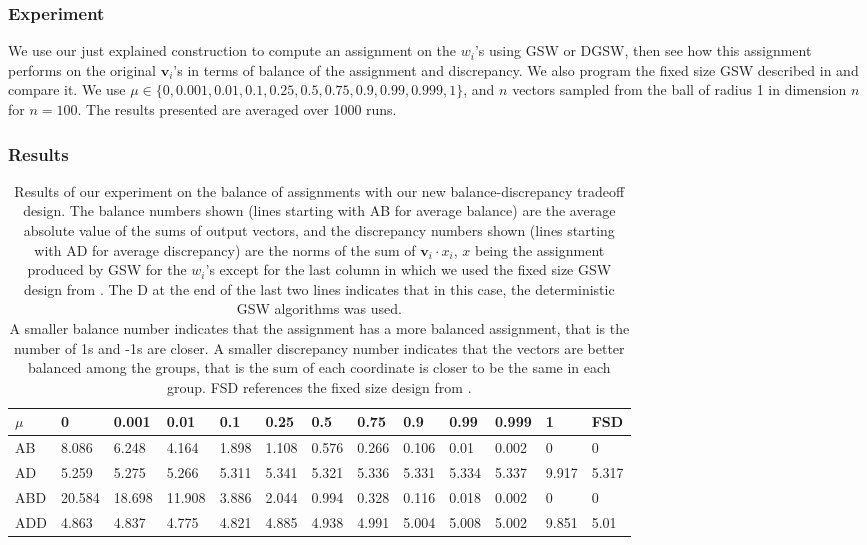 \documentclass[12pt]{article}
\begin{document}
\subsubsection{Experiment}
We use our just explained construction to compute an assignment on the $w_i$'s using GSW or DGSW, then see how this assignment performs on the original $\textbf{v}_i$'s in terms of balance of the assignment and discrepancy. We also program the fixed size GSW described in \cite{harshaw2019balancing} and compare it. We use $\mu\in\{0,0.001,0.01,0.1,0.25,0.5,0.75,0.9,0.99,0.999,1\}$, and $n$ vectors sampled from the ball of radius 1 in dimension $n$ for $n=100$. The results presented are averaged over 1000 runs.

\subsubsection{Results}

\begin{center}
\begin{table}[h]
\begin{tabular}{l|llllllllllll}
 $\mu$ &0&0.001&0.01&0.1&0.25&0.5&0.75&0.9&0.99&0.999&1&FSD \cite{harshaw2019balancing}\\
\hline
AB&8.086&6.248&4.164&1.898&1.108&0.576&0.266&0.106&0.01&0.002&0&0 \\
AD&5.259&5.275&5.266&5.311&5.341&5.321&5.336&5.331&5.334&5.337&9.917&5.317\\
ABD&20.584&18.698&11.908&3.886&2.044&0.994&0.328&0.116&0.018&0.002&0&0\\
ADD&4.863&4.837&4.775&4.821&4.885&4.938&4.991&5.004&5.008&5.002&9.851&5.01
\end{tabular}
\caption{Results of our experiment on the balance of assignments with our new balance-discrepancy tradeoff design. The balance numbers shown (lines starting with AB for average balance) are the average absolute value of the sums of output vectors, and the discrepancy numbers shown (lines starting with AD for average discrepancy) are the norms of the sum of $\textbf{v}_i\cdot x_i$, $x$ being the assignment produced by GSW for the $w_i$'s except for the last column in which we used the fixed size GSW design from \cite{harshaw2019balancing}. The D at the end of the last two lines indicates that in this case, the deterministic GSW algorithms was used. \\A smaller balance number indicates that the assignment has a more balanced assignment, that is the number of 1s and -1s are closer. A smaller discrepancy number indicates that the vectors are better balanced among the groups, that is the sum of each coordinate is closer to be the same in each group. FSD \cite{harshaw2019balancing} references the fixed size design from \cite{harshaw2019balancing}.}
\label{balance_tradeoff_results}
\end{table}
\end{center}
\end{document}
